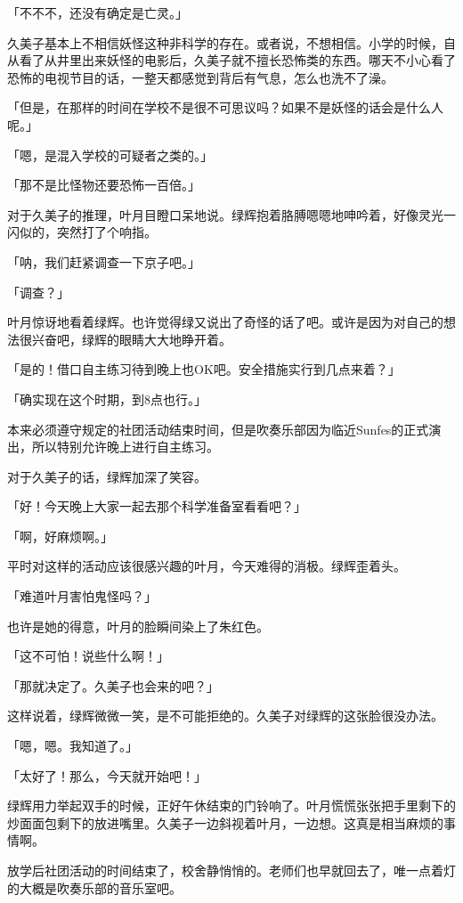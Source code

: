 \documentclass[UTF8]{ctexart}
\begin{document}
    「不不不，还没有确定是亡灵。」

    久美子基本上不相信妖怪这种非科学的存在。或者说，不想相信。小学的时候，自从看了从井里出来妖怪的电影后，久美子就不擅长恐怖类的东西。哪天不小心看了恐怖的电视节目的话，一整天都感觉到背后有气息，怎么也洗不了澡。

    「但是，在那样的时间在学校不是很不可思议吗？如果不是妖怪的话会是什么人呢。」

    「嗯，是混入学校的可疑者之类的。」

    「那不是比怪物还要恐怖一百倍。」

    对于久美子的推理，叶月目瞪口呆地说。绿辉抱着胳膊嗯嗯地呻吟着，好像灵光一闪似的，突然打了个响指。

    「呐，我们赶紧调查一下京子吧。」

    「调查？」

    叶月惊讶地看着绿辉。也许觉得绿又说出了奇怪的话了吧。或许是因为对自己的想法很兴奋吧，绿辉的眼睛大大地睁开着。

    「是的！借口自主练习待到晚上也OK吧。安全措施实行到几点来着？」

    「确实现在这个时期，到8点也行。」

    本来必须遵守规定的社团活动结束时间，但是吹奏乐部因为临近Sunfes的正式演出，所以特别允许晚上进行自主练习。

    对于久美子的话，绿辉加深了笑容。

    「好！今天晚上大家一起去那个科学准备室看看吧？」

    「啊，好麻烦啊。」

    平时对这样的活动应该很感兴趣的叶月，今天难得的消极。绿辉歪着头。

    「难道叶月害怕鬼怪吗？」

    也许是她的得意，叶月的脸瞬间染上了朱红色。

    「这不可怕！说些什么啊！」

    「那就决定了。久美子也会来的吧？」

    这样说着，绿辉微微一笑，是不可能拒绝的。久美子对绿辉的这张脸很没办法。

    「嗯，嗯。我知道了。」

    「太好了！那么，今天就开始吧！」

    绿辉用力举起双手的时候，正好午休结束的门铃响了。叶月慌慌张张把手里剩下的炒面面包剩下的放进嘴里。久美子一边斜视着叶月，一边想。这真是相当麻烦的事情啊。

    放学后社团活动的时间结束了，校舍静悄悄的。老师们也早就回去了，唯一点着灯的大概是吹奏乐部的音乐室吧。
\end{document}

